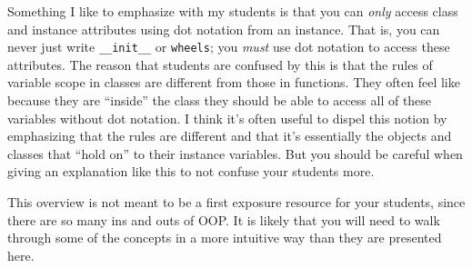 \begin{meta}
Something I like to emphasize with my students is that you can \textit{only} access class and instance attributes using dot notation from an instance. That is, you can never just write \lstinline{__init__} or \lstinline{wheels}; you \textit{must} use dot notation to access these attributes. The reason that students are confused by this is that the rules of variable scope in classes are different from those in functions. They often feel like because they are ``inside'' the class they should be able to access all of these variables without dot notation. I think it's often useful to dispel this notion by emphasizing that the rules are different and that it's essentially the objects and classes that ``hold on'' to their instance variables. But you should be careful when giving an explanation like this to not confuse your students more. 

This overview is not meant to be a first exposure resource for your students, since there are so many ins and outs of OOP. It is likely that you will need to walk through some of the concepts in a more intuitive way than they are presented here. 
\end{meta}
